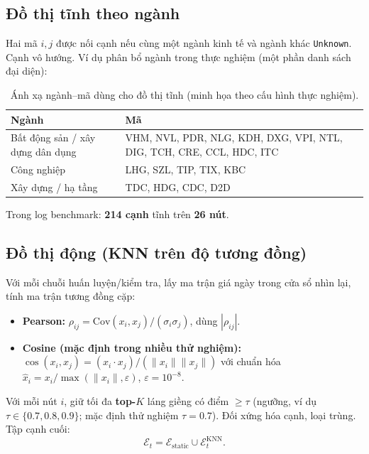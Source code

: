 \documentclass[12pt,a4paper]{article}
\begin{document}
\subsection{Đồ thị tĩnh theo ngành}
Hai mã $i,j$ được nối cạnh nếu cùng một ngành kinh tế và ngành khác \texttt{Unknown}. Cạnh vô hướng. Ví dụ phân bổ ngành trong thực nghiệm (một phần danh sách đại diện):

\begin{table}[H]
\centering\small
\begin{tabular}{@{}L{2.8cm} L{11.2cm}@{}}
\toprule
\textbf{Ngành} & \textbf{Mã} \\
\midrule
Bất động sản / xây dựng dân dụng & VHM, NVL, PDR, NLG, KDH, DXG, VPI, NTL, DIG, TCH, CRE, CCL, HDC, ITC \\
Công nghiệp & LHG, SZL, TIP, TIX, KBC \\
Xây dựng / hạ tầng & TDC, HDG, CDC, D2D \\
\bottomrule
\end{tabular}
\caption{Ánh xạ ngành--mã dùng cho đồ thị tĩnh (minh họa theo cấu hình thực nghiệm).}
\label{tab:sectors}
\end{table}

Trong log benchmark: \textbf{214 cạnh} tĩnh trên \textbf{26 nút}.

\subsection{Đồ thị động (KNN trên độ tương đồng)}
Với mỗi chuỗi huấn luyện/kiểm tra, lấy ma trận giá ngày trong cửa sổ nhìn lại, tính ma trận tương đồng cặp:
\begin{itemize}[leftmargin=1.5em]
  \item \textbf{Pearson:} $\rho_{ij} = \mathrm{Cov}(x_i,x_j)/(\sigma_i\sigma_j)$, dùng $|\rho_{ij}|$.
  \item \textbf{Cosine (mặc định trong nhiều thử nghiệm):} $\cos(x_i,x_j) = (x_i\cdot x_j)/(\|x_i\|\|x_j\|)$ với chuẩn hóa $\hat x_i = x_i/\max(\|x_i\|,\varepsilon)$, $\varepsilon=10^{-8}$.
\end{itemize}
Với mỗi nút $i$, giữ tối đa \textbf{top-$K$} láng giềng có điểm $\ge \tau$ (ngưỡng, ví dụ $\tau\in\{0.7,0.8,0.9\}$; mặc định thử nghiệm $\tau=0.7$). Đối xứng hóa cạnh, loại trùng. Tập cạnh cuối:
\begin{equation}
  \mathcal{E}_t = \mathcal{E}_{\mathrm{static}} \cup \mathcal{E}^{\mathrm{KNN}}_t.
\end{equation}
\end{document}
